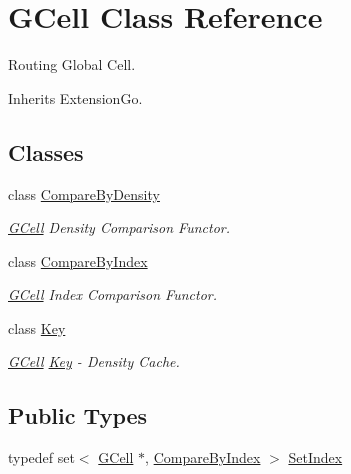 \hypertarget{classKatabatic_1_1GCell}{}\section{G\+Cell Class Reference}
\label{classKatabatic_1_1GCell}


Routing Global Cell.  




Inherits Extension\+Go.

\subsection*{Classes}
\begin{DoxyCompactItemize}
\item 
class \mbox{\hyperlink{classKatabatic_1_1GCell_1_1CompareByDensity}{Compare\+By\+Density}}
\begin{DoxyCompactList}\small\item\em \mbox{\hyperlink{classKatabatic_1_1GCell}{G\+Cell}} Density Comparison Functor. \end{DoxyCompactList}\item 
class \mbox{\hyperlink{classKatabatic_1_1GCell_1_1CompareByIndex}{Compare\+By\+Index}}
\begin{DoxyCompactList}\small\item\em \mbox{\hyperlink{classKatabatic_1_1GCell}{G\+Cell}} Index Comparison Functor. \end{DoxyCompactList}\item 
class \mbox{\hyperlink{classKatabatic_1_1GCell_1_1Key}{Key}}
\begin{DoxyCompactList}\small\item\em \mbox{\hyperlink{classKatabatic_1_1GCell}{G\+Cell}} \mbox{\hyperlink{classKatabatic_1_1GCell_1_1Key}{Key}} -\/ Density Cache. \end{DoxyCompactList}\end{DoxyCompactItemize}
\subsection*{Public Types}
\begin{DoxyCompactItemize}
\item 
typedef set$<$ \mbox{\hyperlink{classKatabatic_1_1GCell}{G\+Cell}} $\ast$, \mbox{\hyperlink{classKatabatic_1_1GCell_1_1CompareByIndex}{Compare\+By\+Index}} $>$ \mbox{\hyperlink{classKatabatic_1_1GCell_aacb1c215b203bfba5729f135b3221d40}{Set\+Index}}
\end{DoxyCompactItemize}
